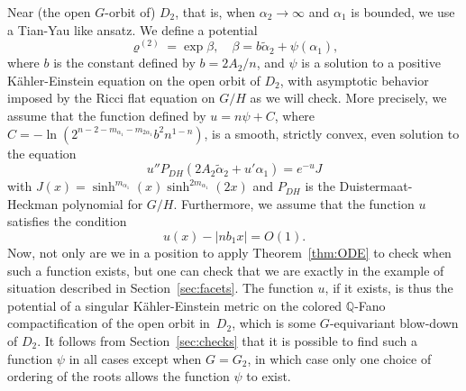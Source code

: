 \documentclass[JEP,XML,SOM,Unicode, NoEqCountersInSection, NoFloatCountersInSection]{cedram}
\theoremstyle{plain}
\theoremstyle{definition}
\newcommand{\ta}{\tilde \alpha}
\newcommand{\rhodeux}{\varrho^{(2)}}
\begin{document}
Near (the open $G$-orbit of) $D_2$, that is, when $\alpha_2\to \infty$ and $\alpha_1$ is bounded,
we use a Tian-Yau like ansatz.
We define a potential
\[ \rhodeux=\exp \beta, \quad \beta=b\ta_2+\psi(\alpha_1), \]
where $b$ is the constant defined by $b=2A_2/n$,
and $\psi$ is a solution to a positive Kähler-Einstein equation on the open orbit of $D_2$,
with asymptotic behavior imposed by the Ricci flat equation on $G/H$ as we will check.
More precisely, we assume that the function defined by $u=n\psi+C$,
where $C=-\ln(2^{n-2-m_{\alpha_1}-m_{2\alpha_1}}b^2n^{1-n})$, is a smooth, strictly convex, even
solution to the equation
\begin{equation}
\label{eqn:eqn-psi}
u''P_{DH}(2A_2\ta_2+u'\alpha_1)=e^{-u}J
\end{equation}
with $J(x)=\sinh^{m_{\alpha_1}}(x)\sinh^{2m_{\alpha_1}}(2x)$
and $P_{DH}$ is the Duistermaat-Heckman polynomial for $G/H$.
Furthermore, we assume that the function $u$ satisfies the condition
\begin{equation}
u(x)-|nb_1x|=O(1).
\end{equation}
Now, not only are we in a position to apply Theorem~\ref{thm:ODE} to check when such a function
exists, but one can check that we are exactly in the example of situation described in
Section~\ref{sec:facets}. The function $u$, if it exists, is thus the potential of a singular
Kähler-Einstein metric on the colored $\mathbb{Q}$-Fano compactification of the open orbit in~$D_2$,
which is some $G$-equivariant blow-down of $D_2$.
It follows from Section~\ref{sec:checks} that it is possible to find such a function $\psi$ in all
cases except when $G=G_2$, in which case only one choice of ordering of the roots allows the
function $\psi$ to exist.
\end{document}
